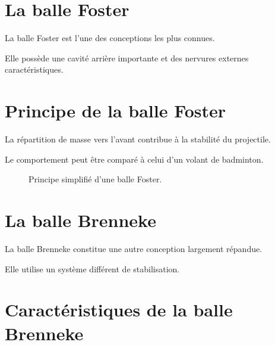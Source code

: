 \section{La balle Foster}

La balle Foster est l'une des conceptions les plus connues.

Elle possède une cavité arrière importante et des nervures externes
caractéristiques.

\section{Principe de la balle Foster}

La répartition de masse vers l'avant contribue à la stabilité du projectile.

Le comportement peut être comparé à celui d'un volant de badminton.

\begin{figure}[htbp]
\centering


\caption{Principe simplifié d'une balle Foster.}
\label{fig:balle_foster}

\end{figure}

\section{La balle Brenneke}

La balle Brenneke constitue une autre conception largement répandue.

Elle utilise un système différent de stabilisation.

\section{Caractéristiques de la balle Brenneke}

